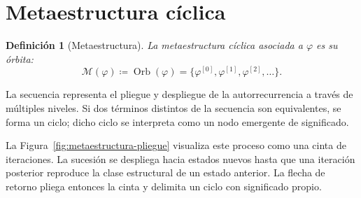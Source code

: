 \documentclass[11pt]{article}
\numberwithin{equation}{section}
\theoremstyle{prism}
\newtheorem{definicion}{Definición}
\newcommand{\iter}[2]{#1^{[#2]}}
\DeclareMathOperator{\Orb}{Orb}
\begin{document}
\FloatBarrier
\section{Metaestructura cíclica}

\begin{definicion}[Metaestructura]
La metaestructura cíclica asociada a $\varphi$ es su órbita:
\begin{equation}
  \mathscr{M}(\varphi)
  \coloneqq\Orb(\varphi)
  =\bigl\{\iter{\varphi}{0},\iter{\varphi}{1},
  \iter{\varphi}{2},\ldots\bigr\}.
  \label{eq:metaestructura}
\end{equation}
\end{definicion}

La secuencia representa el pliegue y despliegue de la autorrecurrencia a través
de múltiples niveles. Si dos términos distintos de la secuencia son equivalentes,
se forma un ciclo; dicho ciclo se interpreta como un nodo emergente de
significado.

La Figura~\ref{fig:metaestructura-pliegue} visualiza este proceso como una cinta
de iteraciones. La sucesión se despliega hacia estados nuevos hasta que una
iteración posterior reproduce la clase estructural de un estado anterior. La
flecha de retorno pliega entonces la cinta y delimita un ciclo con significado
propio.
\end{document}
